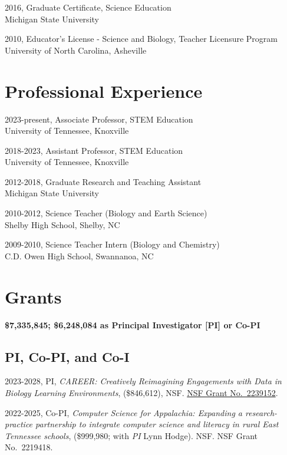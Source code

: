 \documentclass[
  14,
]{article}
\begin{document}
2016, Graduate Certificate, Science Education\\
Michigan State University

2010, Educator's License - Science and Biology, Teacher Licensure
Program\\
University of North Carolina, Asheville

\hypertarget{professional-experience}{%
\section{Professional Experience}\label{professional-experience}}

2023-present, Associate Professor, STEM Education\\
University of Tennessee, Knoxville

2018-2023, Assistant Professor, STEM Education\\
University of Tennessee, Knoxville

2012-2018, Graduate Research and Teaching Assistant\\
Michigan State University

2010-2012, Science Teacher (Biology and Earth Science)\\
Shelby High School, Shelby, NC

2009-2010, Science Teacher Intern (Biology and Chemistry)\\
C.D. Owen High School, Swannanoa, NC

\hypertarget{grants}{%
\section{Grants}\label{grants}}

\textbf{\$7,335,845; \$6,248,084 as Principal Investigator {[}PI{]} or
Co-PI}

\hypertarget{pi-co-pi-and-co-i}{%
\subsection{PI, Co-PI, and Co-I}\label{pi-co-pi-and-co-i}}

2023-2028, PI, \emph{CAREER: Creatively Reimagining Engagements with
Data in Biology Learning Environments}, (\$846,612), NSF.
\href{https://www.nsf.gov/awardsearch/showAward?AWD_ID=2239152\&HistoricalAwards=false}{NSF
Grant No.~2239152}.

2022-2025, Co-PI, \emph{Computer Science for Appalachia: Expanding a
research-practice partnership to integrate computer science and literacy
in rural East Tennessee schools}, (\$999,980; with \emph{PI} Lynn
Hodge). NSF. NSF Grant No.~2219418.
\end{document}
